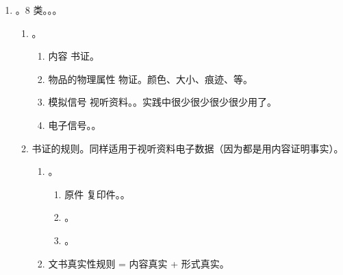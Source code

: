 \begin{enumerate}
\begin{enumerate}
                。
                。
                \begin{enumerate}
                  \item 本证。该证据要证明的待证事实是啥 \yjt 谁承担证明责任 \yjt 承担的人拿出来 \yjt 本证。要达证明标准。
                  \item 反证。无需达到证明标准，只是为了反驳对方主张的事实 \yjt 事实不清证据不明 \yjt 对方倒霉。
                \end{enumerate}
        \end{enumerate}
  \item {}。8 类。。。
        \begin{enumerate}
          \item {}。
                \begin{enumerate}
                  \item 内容 \yjt 书证。
                  \item 物品的物理属性 \yjt 物证。颜色、大小、痕迹、等。
                  \item 模拟信号 \yjt 视听资料。。实践中很少很少很少很少用了。
                  \item 电子信号\yjt {}。。
                \end{enumerate}
          \item 书证的规则。同样适用于视听资料电子数据（因为都是用内容证明事实）。
                \begin{enumerate}
                  \item {}。
                        \begin{enumerate}
                          \item 原件 \dy 复印件。。
                          \item {}。
                          \item {}。
                        \end{enumerate}
                  \item 文书真实性规则 = 内容真实 + 形式真实。
                        \begin{enumerate}

\end{enumerate}
\end{enumerate}
\end{enumerate}
\end{enumerate}
